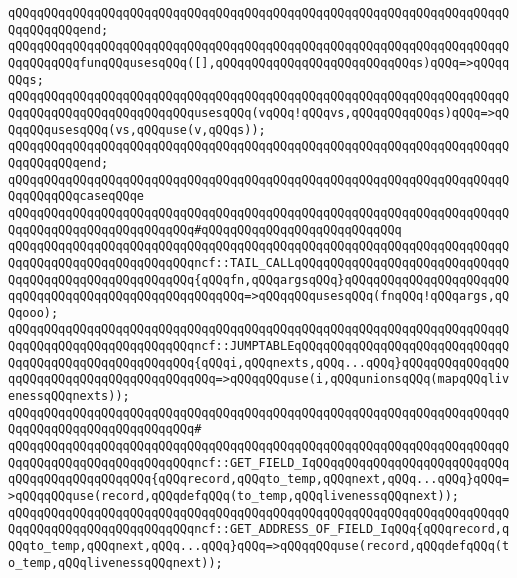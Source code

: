 \verb|qQQqqQQqqQQqqQQqqQQqqQQqqQQqqQQqqQQqqQQqqQQqqQQqqQQqqQQqqQQqqQQqqQQqqQQqqQQqqQQqend;|\newline
\newline
\verb|qQQqqQQqqQQqqQQqqQQqqQQqqQQqqQQqqQQqqQQqqQQqqQQqqQQqqQQqqQQqqQQqqQQqqQQqqQQqqQQqfunqQQqusesqQQq([],qQQqqQQqqQQqqQQqqQQqqQQqqQQqs)qQQq=>qQQqqQQqs;|\newline
\verb|qQQqqQQqqQQqqQQqqQQqqQQqqQQqqQQqqQQqqQQqqQQqqQQqqQQqqQQqqQQqqQQqqQQqqQQqqQQqqQQqqQQqqQQqqQQqqQQqusesqQQq(vqQQq!qQQqvs,qQQqqQQqqQQqs)qQQq=>qQQqqQQqusesqQQq(vs,qQQquse(v,qQQqs));|\newline
\verb|qQQqqQQqqQQqqQQqqQQqqQQqqQQqqQQqqQQqqQQqqQQqqQQqqQQqqQQqqQQqqQQqqQQqqQQqqQQqqQQqend;|\newline
\newline
\verb|qQQqqQQqqQQqqQQqqQQqqQQqqQQqqQQqqQQqqQQqqQQqqQQqqQQqqQQqqQQqqQQqqQQqqQQqqQQqqQQqcaseqQQqe|\newline
\verb|qQQqqQQqqQQqqQQqqQQqqQQqqQQqqQQqqQQqqQQqqQQqqQQqqQQqqQQqqQQqqQQqqQQqqQQqqQQqqQQqqQQqqQQqqQQqqQQq#qQQqqQQqqQQqqQQqqQQqqQQqqQQq|\newline
\verb|qQQqqQQqqQQqqQQqqQQqqQQqqQQqqQQqqQQqqQQqqQQqqQQqqQQqqQQqqQQqqQQqqQQqqQQqqQQqqQQqqQQqqQQqqQQqqQQqncf::TAIL_CALLqQQqqQQqqQQqqQQqqQQqqQQqqQQqqQQqqQQqqQQqqQQqqQQqqQQqqQQq{qQQqfn,qQQqargsqQQq}qQQqqQQqqQQqqQQqqQQqqQQqqQQqqQQqqQQqqQQqqQQqqQQqqQQqqQQq=>qQQqqQQqusesqQQq(fnqQQq!qQQqargs,qQQqooo);|\newline
\verb|qQQqqQQqqQQqqQQqqQQqqQQqqQQqqQQqqQQqqQQqqQQqqQQqqQQqqQQqqQQqqQQqqQQqqQQqqQQqqQQqqQQqqQQqqQQqqQQqncf::JUMPTABLEqQQqqQQqqQQqqQQqqQQqqQQqqQQqqQQqqQQqqQQqqQQqqQQqqQQqqQQq{qQQqi,qQQqnexts,qQQq...qQQq}qQQqqQQqqQQqqQQqqQQqqQQqqQQqqQQqqQQqqQQqqQQq=>qQQqqQQquse(i,qQQqunionsqQQq(mapqQQqlivenessqQQqnexts));|\newline
\verb|qQQqqQQqqQQqqQQqqQQqqQQqqQQqqQQqqQQqqQQqqQQqqQQqqQQqqQQqqQQqqQQqqQQqqQQqqQQqqQQqqQQqqQQqqQQqqQQq#|\newline
\verb|qQQqqQQqqQQqqQQqqQQqqQQqqQQqqQQqqQQqqQQqqQQqqQQqqQQqqQQqqQQqqQQqqQQqqQQqqQQqqQQqqQQqqQQqqQQqqQQqncf::GET_FIELD_IqQQqqQQqqQQqqQQqqQQqqQQqqQQqqQQqqQQqqQQqqQQqqQQq{qQQqrecord,qQQqto_temp,qQQqnext,qQQq...qQQq}qQQq=>qQQqqQQquse(record,qQQqdefqQQq(to_temp,qQQqlivenessqQQqnext));|\newline
\verb|qQQqqQQqqQQqqQQqqQQqqQQqqQQqqQQqqQQqqQQqqQQqqQQqqQQqqQQqqQQqqQQqqQQqqQQqqQQqqQQqqQQqqQQqqQQqqQQqncf::GET_ADDRESS_OF_FIELD_IqQQq{qQQqrecord,qQQqto_temp,qQQqnext,qQQq...qQQq}qQQq=>qQQqqQQquse(record,qQQqdefqQQq(to_temp,qQQqlivenessqQQqnext));|\newline
